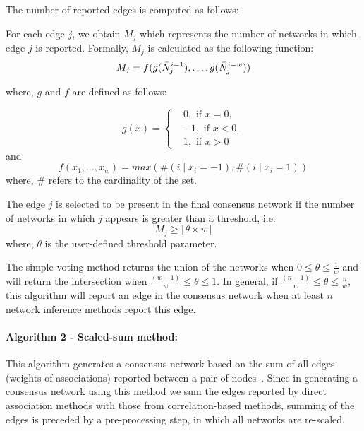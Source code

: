 \documentclass[letterpaper,12pt]{article}
\begin{document}
 The number of reported edges is computed as follows:

 For each edge $j$, we obtain $M_j$ which represents the number of networks in which edge $j$ is reported.
 Formally, $M_j$ is calculated as the following function:
  \begin{equation}
      M_j = f(g(\bar{N}^{i=1}_j), \dots, g(\bar{N}^{i=w}_j)) \\
    \label{eq:simple-voting}
  \end{equation}

where, $g$ and $f$ are defined as follows:

  \begin{equation*}
    g(x) =
    \begin{cases}
       & 0, \text{ if } x=0, \\
       & -1, \text{ if } x<0, \\
       & 1, \text{ if } x>0
    \end{cases}
  \end{equation*}
  and
  \begin{equation*}
    f(x_1,\dots,x_w) = max \left( \#(i \mid x_i=-1),\#(i \mid x_i=1)
       \right)
  \end{equation*}
  where, $\#$ refers to the cardinality of the set.

 The edge $j$ is selected to be present in the final consensus network if the number of networks in which $j$ appears is greater than a threshold, i.e:
  \begin{equation}
     M_j \geq \lfloor \theta \times w \rfloor
    \label{eqn:simple-voting2}
  \end{equation}
  where, $\theta$ is the user-defined threshold parameter.

  The simple voting method returns the union of the networks when $0 \leq \theta \leq \frac{1}{w}$ and will return the intersection when $\frac{(w - 1)}{w} \leq \theta \leq 1$.
  In general, if $\frac{(n - 1)}{w} \leq \theta \leq \frac{n}{w}$, this algorithm will report an edge in the consensus network when at least $n$ network inference methods report this edge.


  \paragraph*{Algorithm 2 - Scaled-sum method:}

  This algorithm generates a consensus network based on the sum of all edges (weights of associations) reported between a pair of nodes~\cite{bustinceFuzzySetsTheir2008,tsarevApplicationMajorityVoting2018}.
  Since in generating a consensus network using this method we sum the edges reported by direct association methods with those from correlation-based methods, summing of the edges is preceded by a pre-processing step, in which all networks are re-scaled.
\end{document}
